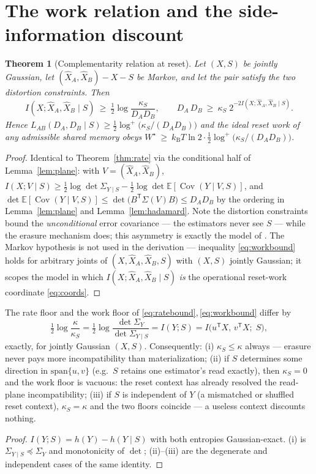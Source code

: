 \documentclass[11pt]{article}
\newtheorem{theorem}{Theorem}\newtheorem{lemma}{Lemma}
\newcommand{\E}{\mathbb{E}}\newcommand{\tr}{\operatorname{tr}}
\newcommand{\Cov}{\operatorname{Cov}}\newcommand{\Var}{\operatorname{Var}}
\newcommand{\hX}{\widehat X}\newcommand{\hY}{\widehat Y}
\newcommand{\kb}{k_{\mathrm B}}
\begin{document}
\section{The work relation and the side-information discount}
\begin{theorem}[Complementarity relation at reset]\label{thm:work}
Let $(X,S)$ be jointly Gaussian, let $(\hX_A,\hX_B)-X-S$ be Markov, and let
the pair satisfy the two distortion constraints. Then
\begin{equation}
I(X;\hX_A,\hX_B\mid S)\ \ge\ \tfrac12\log\frac{\kappa_S}{D_AD_B},
\qquad
D_A\,D_B\ \ge\ \kappa_S\;2^{-2I(X;\hX_A,\hX_B\mid S)} .
\label{eq:workbound}
\end{equation}
Hence $L_{AB}(D_A,D_B\mid S)\ge\tfrac12\log^+\!\bigl(\kappa_S/(D_AD_B)\bigr)$
and the ideal reset work of any admissible shared memory obeys
$W^\star\ \ge\ \kb T\ln2\cdot\tfrac12\log^+\!\bigl(\kappa_S/(D_AD_B)\bigr)$.
\end{theorem}
\begin{proof}
Identical to Theorem~\ref{thm:rate} via the conditional half of
Lemma~\ref{lem:plane}: with $V=(\hX_A,\hX_B)$,
$I(X;V\mid S)\ge\tfrac12\log\det\Sigma_{Y\mid S}
-\tfrac12\log\det\E[\Cov(Y\mid V,S)]$, and
$\det\E[\Cov(Y\mid V,S)]\le\det\bigl(B^{\mathsf T}\Sigma(V)B\bigr)\le
D_AD_B$ by the ordering in Lemma~\ref{lem:plane} and
Lemma~\ref{lem:hadamard}. Note the distortion constraints bound the
\emph{unconditional} error covariance --- the estimators never see $S$ ---
while the erasure mechanism does; this asymmetry is exactly the model of
\cite{bondlandauerV}. The Markov hypothesis is not used in the derivation
--- inequality \eqref{eq:workbound} holds for arbitrary joints of
$(X,\hX_A,\hX_B,S)$ with $(X,S)$ jointly Gaussian; it scopes the model in
which $I(X;\hX_A,\hX_B\mid S)$ \emph{is} the operational reset-work
coordinate \eqref{eq:coords}.
\end{proof}

\begin{corollary}
\label{cor:discount}
The rate floor and the work floor of
\eqref{eq:ratebound},\,\eqref{eq:workbound} differ by
\[
\tfrac12\log\frac{\kappa}{\kappa_S}
=\tfrac12\log\frac{\det\Sigma_Y}{\det\Sigma_{Y\mid S}}
=I(Y;S)
=I\bigl(u^{\mathsf T}X,\,v^{\mathsf T}X;\;S\bigr),
\]
exactly, for jointly Gaussian $(X,S)$. Consequently: (i) $\kappa_S\le\kappa$
always --- erasure never pays more incompatibility than materialization;
(ii) if $S$ determines some direction in $\mathrm{span}\{u,v\}$ (e.g.\ $S$
retains one estimator's read exactly), then $\kappa_S=0$ and the work floor
is vacuous: the reset context has already resolved the read-plane
incompatibility; (iii) if $S$ is independent of $Y$ (a mismatched or
shuffled reset context), $\kappa_S=\kappa$ and the two floors coincide ---
a useless context discounts nothing.
\end{corollary}
\begin{proof}
$I(Y;S)=h(Y)-h(Y\mid S)$ with both entropies Gaussian-exact. (i) is
$\Sigma_{Y\mid S}\preceq\Sigma_Y$ and monotonicity of $\det$; (ii)--(iii)
are the degenerate and independent cases of the same identity.
\end{proof}
\end{document}
